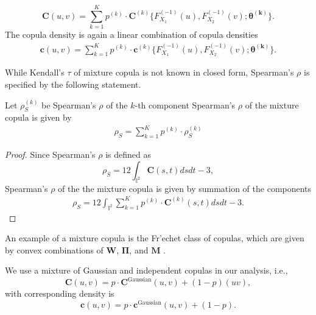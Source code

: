 \begin{equation*} 
    \bm{C}(u,v)= \sum_{k=1}^K p^{(k)} \cdot \bm{C}^{(k)}\{F^{(-1)}_{X_1}(u),
    F^{(-1)}_{X_2}(v); \bm{\theta^{(k)}}\}.
    \end{equation*}
The copula density is again a linear combination of copula densities
\begin{align*}
    \bm{c}(u,v)= \sum_{k=1}^K p^{(k)} \cdot \bm{c}^{(k)}\{F^{(-1)}_{X_1}(u),
    F^{(-1)}_{X_2}(v); \bm{\theta^{(k)}}\}.
    \end{align*}

While Kendall's $\tau$ of mixture copula is not known in closed form,
Spearman's $\rho$ is specified by the following statement. 

\begin{proposition}
  Let $\rho_S^{(k)}$ be Spearman's $\rho$ of the $k$-th component
  Spearman's $\rho$ of the mixture copula is given by 
  \begin{align}
        \rho_S = \sum_{k=1}^K p^{(k)} \cdot \rho_S^{(k)}
        \end{align}
    \end{proposition}

\begin{proof}
    Since Spearman's $\rho$ is defined as \citep{Nelsen1999}
    \begin{equation*}
      \rho_S = 12 \int_{\mathbb{I}^2} \bm{C}(s,t) ds dt - 3,
    \end{equation*}
    Spearman's $\rho$ of the the mixture copula is given by summation
    of the components 
       \begin{align}
        \rho_S = 12 \int_{\mathbb{I}^2} \sum_{k=1}^K p^{(k)} \cdot
         \bm{C}^{(k)}(s,t) ds dt - 3. 
        \end{align}
    \end{proof}

An example of a mixture copula is the Fr'echet class of copulas, which are given by convex combinations of $\bm{W}$,
  $\bm{\Pi}$, and $\bm{M}$ \citep{Nelsen1999}. \medskip

We use a mixture of Gaussian and independent copulas in our analysis,
i.e., 
\begin{equation*}
  \bm{C}(u,v) = p\cdot \bm{C}^\text{Gaussian}(u,v) + (1-p)(uv),
\end{equation*}
with corresponding density is
\begin{equation*}
  \bm{c}(u,v) = p\cdot \bm{c}^\text{Gaussian}(u,v) + (1-p).
\end{equation*}

